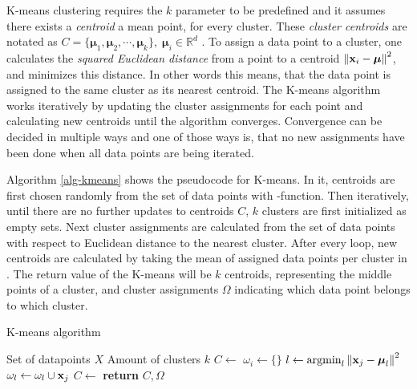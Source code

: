 K-means clustering requires the $k$ parameter to be predefined and it assumes there exists a \emph{centroid} \ie a mean point, for every cluster. These \emph{cluster centroids} are notated as $C = \{\boldsymbol{\mu}_1, \boldsymbol{\mu}_2, \cdots, \boldsymbol{\mu}_k\}, \; \boldsymbol{\mu}_i \in \mathbb{R}^d$ \cite{Manning:2008:IIR:1394399}. To assign a data point to a cluster, one calculates the \emph{squared Euclidean distance} from a point to a centroid $\left\lVert\mathbf{x}_i - \boldsymbol{\mu}\right\rVert^2$, and minimizes this distance. In other words this means, that the data point is assigned to the same cluster as its nearest centroid. The K-means algorithm works iteratively by updating the cluster assignments for each point and calculating new centroids until the algorithm converges. Convergence can be decided in multiple ways and one of those ways is, that no new assignments have been done when all data points are being iterated. 


Algorithm \ref{alg-kmeans} shows the pseudocode for K-means. In it, centroids are first chosen randomly from the set of data points with -function. Then iteratively, until there are no further updates to centroids $C$, $k$ clusters are first initialized as empty sets. Next cluster assignments are calculated from the set of data points with respect to Euclidean distance to the nearest cluster. After every loop, new centroids are calculated by taking the mean of assigned data points per cluster in . The return value of the K-means will be $k$ centroids, representing the middle points of a cluster, and cluster assignments $\Omega$ indicating which data point belongs to which cluster.

\clearpage

\begin{algorithm}[ht]
\caption{K-means algorithm \cite{Manning:2008:IIR:1394399}}
\label{alg-kmeans}
\begin{algorithmic}

\Require Set of datapoints $X$
\Require Amount of clusters $k$
   \State $C  \leftarrow $ 
            \State $\omega_i \gets \{\} $
       \EndFor
            \State $l \gets \operatorname*{argmin}_{l} \left\lVert\mathbf{x}_j - \boldsymbol{\mu}_l\right\rVert^2$
            \State $\omega_l \gets \omega_l \cup \mathbf{x}_j$
        \EndFor
       \State $C \gets $ 
   \EndWhile
\State \textbf{return} $C, \Omega$
\EndProcedure

\end{algorithmic}
\end{algorithm}

